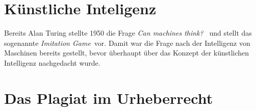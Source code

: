 \documentclass{article}
\begin{document}
\section{Künstliche Inteligenz}
Bereits Alan Turing stellte 1950 die Frage \glqq \textit{Can machines think?}\grqq~\autocite[\ppno~433]{turingCOMPUTINGMACHINERYINTELLIGENCE1950} und stellt das sogenannte \glqq \textit{Imitation Game}\grqq~vor. Damit war die Frage nach der Intelligenz von Maschinen bereits gestellt, bevor überhaupt über das Konzept der künstlichen Intelligenz nachgedacht wurde\autocite[\ppno~10]{laemmelKuenstlicheIntelligenzWissensverarbeitung2023}. 
\section{Das Plagiat im Urheberrecht}

\printbibliography
\end{document}
